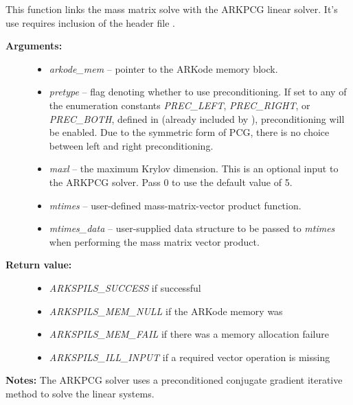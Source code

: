 \documentclass[letterpaper,10pt,english]{sphinxmanual}
\begin{document}

\begin{fulllineitems}
\label{c_interface/User_callable:c.ARKMassPcg}
This function links the mass matrix solve with the ARKPCG linear
solver.  It's use requires inclusion of the header file
.
\begin{description}
\item[{\textbf{Arguments:}}] \leavevmode\begin{itemize}
\item {} 
\emph{arkode\_mem} -- pointer to the ARKode memory block.

\item {} 
\emph{pretype} -- flag denoting whether to use preconditioning.  If
set to any of the enumeration constants \emph{PREC\_LEFT}, \emph{PREC\_RIGHT},
or \emph{PREC\_BOTH}, defined in  (already
included by ), preconditioning will be
enabled. Due to the symmetric form of PCG, there is no choice
between left and right preconditioning.

\item {} 
\emph{maxl} -- the maximum Krylov dimension. This is an optional input
to the ARKPCG solver. Pass 0 to use the default value of 5.

\item {} 
\emph{mtimes} -- user-defined mass-matrix-vector product function.

\item {} 
\emph{mtimes\_data} -- user-supplied data structure to be passed
to \emph{mtimes} when performing the mass matrix vector product.

\end{itemize}

\item[{\textbf{Return value:}}] \leavevmode\begin{itemize}
\item {} 
\emph{ARKSPILS\_SUCCESS} if successful

\item {} 
\emph{ARKSPILS\_MEM\_NULL}  if the ARKode memory was 

\item {} 
\emph{ARKSPILS\_MEM\_FAIL}  if there was a memory allocation failure

\item {} 
\emph{ARKSPILS\_ILL\_INPUT} if a required vector operation is missing

\end{itemize}

\end{description}

\textbf{Notes:} The ARKPCG solver uses a preconditioned conjugate
gradient iterative method to solve the linear systems.

\end{fulllineitems}
\end{document}
